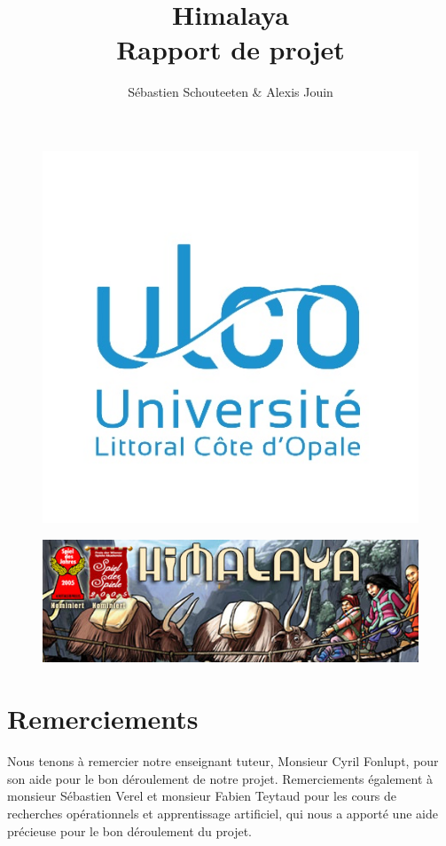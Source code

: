 \documentclass[french]{article}
\title{{\Huge Himalaya} \\ Rapport de projet}
\author{Sébastien Schouteeten \& Alexis Jouin}
\begin{document}
\begin{figure}
	\centering
	\includegraphics[width=0.5\linewidth]{images/ulco}
\end{figure}

\maketitle

\begin{figure}
	\centering
	\includegraphics[width=0.5\linewidth]{images/himalaya}
\end{figure}

\newpage

\tableofcontents

\newpage

\section{Remerciements}
Nous tenons à remercier notre enseignant tuteur, Monsieur Cyril Fonlupt, pour son aide pour le bon déroulement de notre projet. Remerciements également à monsieur Sébastien Verel et monsieur Fabien Teytaud pour les cours de recherches opérationnels et apprentissage artificiel, qui nous a apporté une aide précieuse pour le bon déroulement du projet.

\newpage



\newpage



\newpage


\end{document}
